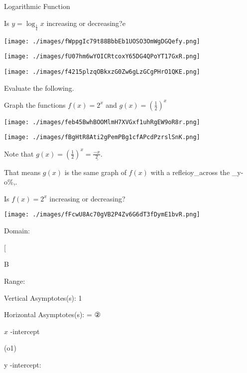 \documentclass{book}
\begin{document}
Logarithmic Function

Is \(y=\log_{\frac14}x\) increasing or decreasing?e

\texttt{[image: ./images/fWppgIc79t88BbbEb1UOSO3OmWgDGQefy.png]}

\texttt{[image: ./images/fU07hm6wYOICRtcoxY65DG4QPoYT17GxR.png]}


\texttt{[image: ./images/f4215plzqOBkxzG0Zw6gLzGCgPHrO1QKE.png]}

	      Evaluate the following.


Graph the functions \(f(x)=2^{x}\) and
\(g(x)=\left(\frac{1}{2}\right)^x\)

\texttt{[image: ./images/feb45BwhBOOMlmH7XVGxf1uhRgEW9oR8r.png]}

\texttt{[image: ./images/fBgHtR8Ati2gPemPBg1cfAPcdPzrslSnK.png]}


Note that
\(g(x)=\left(\frac{1}{2}\right)^{x}=\underline{\frac{-x}{2}.}\)

That means \(g(x)\) is the same graph of \(f(x)\) with a
refleioy\_across the \_y-o\%,.

Is \(f(x)=2^{x}\) increasing or decreasing?

\texttt{[image: ./images/fFcwU8Ac70gVB2P4Zv6G6dT3fDymE1bvR.png]}

Domain:

{[}

B

Range:

Vertical Asymptotes(s): 1

Horizontal Asymptotes(s): = ②

\(x\) -intercept

(o1)

y -intercept:
\end{document}
